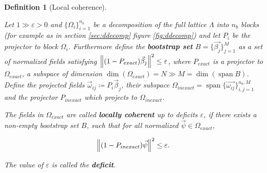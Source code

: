 \documentclass{article}
\DeclareMathOperator{\spn}{span} %
\theoremstyle{plain} %
\newtheorem{definition}{Definition}[section]
\theoremstyle{convention} %
\theoremstyle{remark} %
\def\df#1{\textbf{\textit{#1}}}
\numberwithin{equation}{section}
\begin{document}

\begin{definition}[Local coherence] %

\label{def:local_coherence}

Let $1 \gg \varepsilon > 0$ and $\{\Omega_i\}_{i=1}^{n_b}$ be a decomposition of the full lattice $\Lambda$ into $n_b$ blocks (for example as in section \ref{sec:ddecomp} figure \ref{fig:ddecomp}) and let $P_i$ be the projector to block $\Omega_i$. Furthermore define the \df{bootstrap set} $B = \{\vec{\beta_j}\}_{j=1}^M$ as a set of normalized fields satisfying $\norm{(1-P_{exact}) \vec{\beta}_j }^2 \le \varepsilon$, where $P_{exact}$ is a projector to $\Omega_{exact}$, a subspace of dimension $\dim{(\Omega_{exact})} = N \gg M = \dim{(\spn{B})}$. Define the projected fields $\vec{\omega}_{ij} \coloneqq P_i \vec{\beta}_j$, their subspace $\Omega_{inexact} = \spn{\{\vec{\omega_{ij}}\}_{i,j=1}^{n_b,M}}$ and the projector $P_{inexact}$ which projects to $\Omega_{inexact}$.

The fields in $\Omega_{exact}$ are called \df{locally coherent} up to deficits $\varepsilon$, if there exists a non-empty bootstrap set $B$, such that for all normalized $\vec{\psi} \in \Omega_{exact}$,

\begin{align*}
    \norm{(1-P_{inexact}) \vec{\psi}}^2 \le \varepsilon.
\end{align*}

The value of $\varepsilon$ is called the \df{deficit}.

\end{definition}
\end{document}

